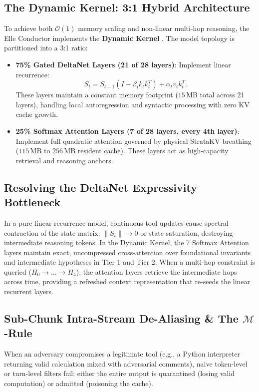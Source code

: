 \documentclass[11pt,letterpaper]{article}
\theoremstyle{definition}
\begin{document}
\subsection{The Dynamic Kernel: 3:1 Hybrid Architecture}
To achieve both $\mathcal{O}(1)$ memory scaling and non-linear multi-hop reasoning, the Elle Conductor implements the \textbf{Dynamic Kernel} \cite{barteau2026dynamickernel}. The model topology is partitioned into a 3:1 ratio:
\begin{itemize}
    \item \textbf{75\% Gated DeltaNet Layers (21 of 28 layers)}: Implement linear recurrence:
    $$S_t = S_{t-1}(I - \beta_t k_t k_t^T) + \alpha_t v_t k_t^T.$$
    These layers maintain a constant memory footprint ($15$\,MB total across 21 layers), handling local autoregression and syntactic processing with zero KV cache growth.
    \item \textbf{25\% Softmax Attention Layers (7 of 28 layers, every 4th layer)}: Implement full quadratic attention governed by physical StrataKV breathing ($115$\,MB to $256$\,MB resident cache). These layers act as high-capacity retrieval and reasoning anchors.
\end{itemize}

\subsection{Resolving the DeltaNet Expressivity Bottleneck}
In a pure linear recurrence model, continuous tool updates cause spectral contraction of the state matrix: $\|S_t\| \to 0$ or state saturation, destroying intermediate reasoning tokens. In the Dynamic Kernel, the 7 Softmax Attention layers maintain exact, uncompressed cross-attention over foundational invariants and intermediate hypotheses in Tier 1 and Tier 2. When a multi-hop constraint is queried ($H_0 \to \dots \to H_4$), the attention layers retrieve the intermediate hops across time, providing a refreshed context representation that re-seeds the linear recurrent layers.

\subsection{Sub-Chunk Intra-Stream De-Aliasing \& The $\mathcal{M}$-Rule}
When an adversary compromises a legitimate tool (e.g., a Python interpreter returning valid calculation mixed with adversarial comments), naive token-level or turn-level filters fail: either the entire output is quarantined (losing valid computation) or admitted (poisoning the cache).
\end{document}
